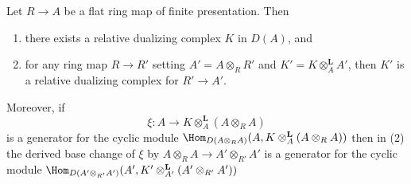 \begin{lemma}
\label{lemma-base-change-relative-dualizing}
Let $R \to A$ be a flat ring map of finite presentation. Then
\begin{enumerate}
\item there exists a relative dualizing complex $K$ in $D(A)$, and
\item for any ring map $R \to R'$ setting $A' = A \otimes_R R'$
and $K' = K \otimes_A^\mathbf{L} A'$, then $K'$ is a
relative dualizing complex for $R' \to A'$.
\end{enumerate}
Moreover, if
$$
\xi : A \longrightarrow K \otimes_A^\mathbf{L} (A \otimes_R A)
$$
is a generator for the cyclic module
$\Hom_{D(A \otimes_R A)}(A, K \otimes_A^\mathbf{L} (A \otimes_R A))$
then in (2) the derived base change of $\xi$ by
$A \otimes_R A \to A' \otimes_{R'} A'$ is a generator for
the cyclic module
$\Hom_{D(A' \otimes_{R'} A')}(A',
K' \otimes_{A'}^\mathbf{L} (A' \otimes_{R'} A'))$
\end{lemma}

